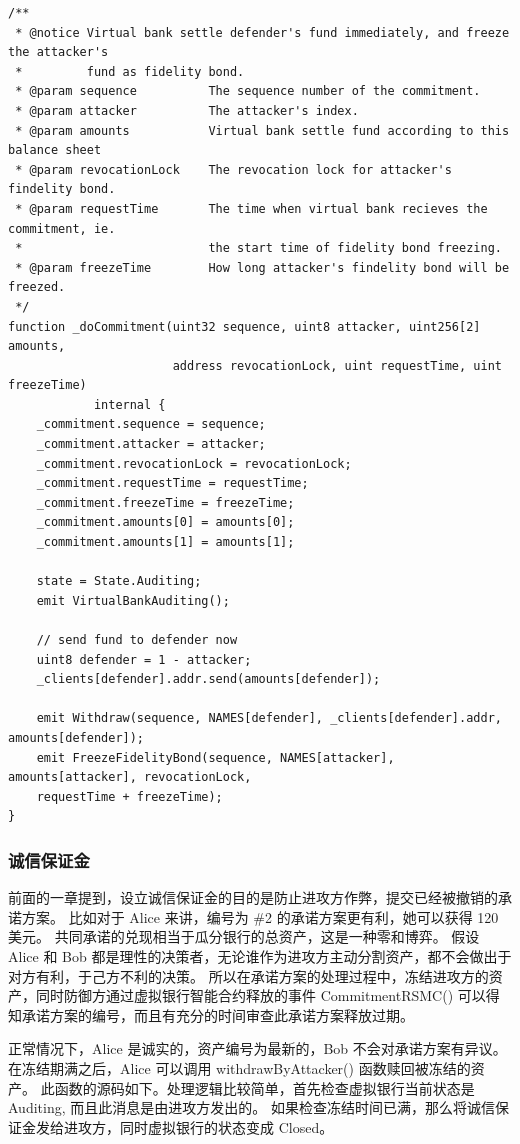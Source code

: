 \begin{appendices}
\begin{lstlisting}[caption={执行共同承诺}, label={lst:_doCommitment}]
/**
 * @notice Virtual bank settle defender's fund immediately, and freeze the attacker's 
 *         fund as fidelity bond.
 * @param sequence          The sequence number of the commitment.
 * @param attacker          The attacker's index.
 * @param amounts           Virtual bank settle fund according to this balance sheet
 * @param revocationLock    The revocation lock for attacker's findelity bond.
 * @param requestTime       The time when virtual bank recieves the commitment, ie. 
 *                          the start time of fidelity bond freezing.
 * @param freezeTime        How long attacker's findelity bond will be freezed.
 */
function _doCommitment(uint32 sequence, uint8 attacker, uint256[2] amounts, 
                       address revocationLock, uint requestTime, uint freezeTime) 
            internal {
    _commitment.sequence = sequence;
    _commitment.attacker = attacker;
    _commitment.revocationLock = revocationLock;
    _commitment.requestTime = requestTime;
    _commitment.freezeTime = freezeTime;
    _commitment.amounts[0] = amounts[0];
    _commitment.amounts[1] = amounts[1];
    
    state = State.Auditing;
    emit VirtualBankAuditing();
    
    // send fund to defender now
    uint8 defender = 1 - attacker;
    _clients[defender].addr.send(amounts[defender]);
    
    emit Withdraw(sequence, NAMES[defender], _clients[defender].addr, amounts[defender]);
    emit FreezeFidelityBond(sequence, NAMES[attacker], amounts[attacker], revocationLock, 
    requestTime + freezeTime);
}
\end{lstlisting}

\subsubsection{诚信保证金}
前面的一章提到，设立诚信保证金的目的是防止进攻方作弊，提交已经被撤销的承诺方案。
比如对于 Alice 来讲，编号为 \#2 的承诺方案更有利，她可以获得 120 美元。
共同承诺的兑现相当于瓜分银行的总资产，这是一种零和博弈。
假设 Alice 和 Bob 都是理性的决策者，无论谁作为进攻方主动分割资产，都不会做出于对方有利，于己方不利的决策。
所以在承诺方案的处理过程中，冻结进攻方的资产，同时防御方通过虚拟银行智能合约释放的事件 CommitmentRSMC() 可以得知承诺方案的编号，而且有充分的时间审查此承诺方案释放过期。

正常情况下，Alice 是诚实的，资产编号为最新的，Bob 不会对承诺方案有异议。
在冻结期满之后，Alice 可以调用 withdrawByAttacker() 函数赎回被冻结的资产。
此函数的源码如下。处理逻辑比较简单，首先检查虚拟银行当前状态是 Auditing, 而且此消息是由进攻方发出的。
如果检查冻结时间已满，那么将诚信保证金发给进攻方，同时虚拟银行的状态变成 Closed。


\end{appendices}
